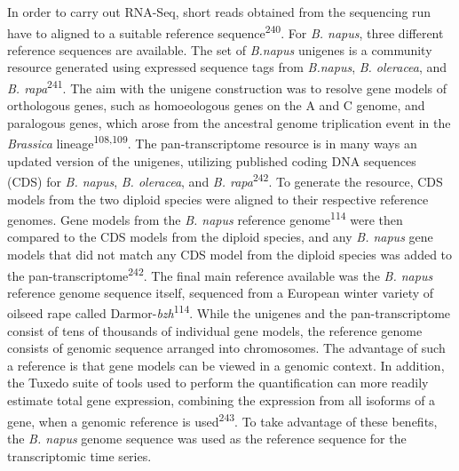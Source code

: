 \documentclass[12pt,]{book}
\begin{document}
In order to carry out RNA-Seq, short reads obtained from the sequencing
run have to aligned to a suitable reference
sequence\textsuperscript{240}. For \emph{B. napus}, three different
reference sequences are available. The set of \emph{B.napus} unigenes is
a community resource generated using expressed sequence tags from
\emph{B.napus}, \emph{B. oleracea}, and \emph{B.
rapa}\textsuperscript{241}. The aim with the unigene construction was to
resolve gene models of orthologous genes, such as homoeologous genes on
the A and C genome, and paralogous genes, which arose from the ancestral
genome triplication event in the \emph{Brassica}
lineage\textsuperscript{108,109}. The pan-transcriptome resource is in
many ways an updated version of the unigenes, utilizing published coding
DNA sequences (CDS) for \emph{B. napus}, \emph{B. oleracea}, and
\emph{B. rapa}\textsuperscript{242}. To generate the resource, CDS
models from the two diploid species were aligned to their respective
reference genomes. Gene models from the \emph{B. napus} reference
genome\textsuperscript{114} were then compared to the CDS models from
the diploid species, and any \emph{B. napus} gene models that did not
match any CDS model from the diploid species was added to the
pan-transcriptome\textsuperscript{242}. The final main reference
available was the \emph{B. napus} reference genome sequence itself,
sequenced from a European winter variety of oilseed rape called
Darmor-\emph{bzh}\textsuperscript{114}. While the unigenes and the
pan-transcriptome consist of tens of thousands of individual gene
models, the reference genome consists of genomic sequence arranged into
chromosomes. The advantage of such a reference is that gene models can
be viewed in a genomic context. In addition, the Tuxedo suite of tools
used to perform the quantification can more readily estimate total gene
expression, combining the expression from all isoforms of a gene, when a
genomic reference is used\textsuperscript{243}. To take advantage of
these benefits, the \emph{B. napus} genome sequence was used as the
reference sequence for the transcriptomic time series.
\end{document}
